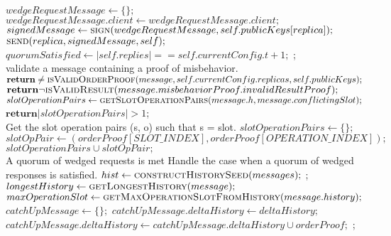 \begin{algorithmic}[1]
          \State $wedgeRequestMessage\gets \{\};$
          \State $wedgeRequestMessage.client\gets wedgeRequestMessage.client;$
          \State $signedMessage\gets \Call{sign}{wedgeRequestMessage, self.publicKeys[replica]};$
          \State $\Call{send}{replica, signedMessage, self};$
      \EndFor
      \State $quorumSatisfied\gets |self.replies| == self.currentConfig.t + 1;$
      \State {};
\EndFunction
\\

 \Comment validate a message containing a proof of misbehavior.
    	\State $\textbf{return} \neq \Call{isValidOrderProof}{message, self.currentConfig.replicas, self.publicKeys};$
    \EndIf
        \State $\textbf{return} \neg \Call{isValidResult}{message.misbehaviorProof.invalidResultProof};$
    \EndIf
	\State $slotOperationPairs\gets \Call {getSlotOperationPairs}{message.h, message.conflictingSlot};$
	\State $\textbf{return} |slotOperationPairs| > 1$;
\EndFunction
\\

 \Comment Get the slot operation pairs (s, o) such that s = slot.
	\State $slotOperationPairs\gets \{\};$
        	\State $slotOpPair\gets (orderProof[SLOT\_INDEX], orderProof[OPERATION\_INDEX]);$
        	\State $slotOperationPairs \cup slotOpPair;$
        \EndIf
    \EndFor
\EndFunction
\\

\Require A quorum of wedged requests is met
 \Comment Handle the case when a quorum of wedged responses is satisfied.
	\State $hist\gets \Call{constructHistorySeed}{messages};$
    \State {};
\EndFunction
\\

 
	\State $longestHistory \gets \Call{getLongestHistory}{message};$
        \State $maxOperationSlot \gets \Call{getMaxOperationSlotFromHistory}{message.history};$
        \State $catchUpMessage \gets \{\};$
        \State $catchUpMessage.deltaHistory \gets deltaHistory;$
                $catchUpMessage.deltaHistory \gets catchUpMessage.deltaHistory \cup orderProof;$
            \EndIf
        \EndFor
        \State {};
    \EndFor
\EndFunction
\\


\end{algorithmic}
